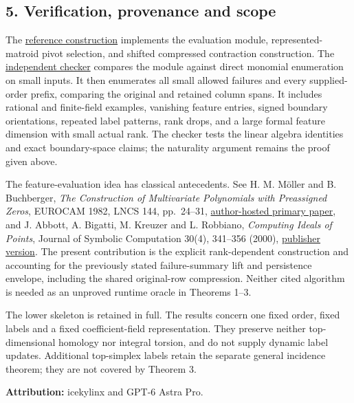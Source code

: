 \hypertarget{af-4b125c3959-verification-provenance-and-scope}{%
\subsection{5. Verification, provenance and scope}\label{af-4b125c3959-verification-provenance-and-scope}}

The \href{https://github.com/icekylinx/algorithm-frontier/blob/main/problems/persistence-failure-certificates/reference/feature_summary.py}{reference construction} implements the evaluation module, represented-matroid pivot selection, and shifted compressed contraction construction. The \href{https://github.com/icekylinx/algorithm-frontier/blob/main/problems/persistence-failure-certificates/verify/check_feature_construction.py}{independent checker} compares the module against direct monomial enumeration on small inputs. It then enumerates all small allowed failures and every supplied-order prefix, comparing the original and retained column spans. It includes rational and finite-field examples, vanishing feature entries, signed boundary orientations, repeated label patterns, rank drops, and a large formal feature dimension with small actual rank. The checker tests the linear algebra identities and exact boundary-space claims; the naturality argument remains the proof given above.

The feature-evaluation idea has classical antecedents. See H. M. Möller and B. Buchberger, \emph{The Construction of Multivariate Polynomials with Preassigned Zeros}, EUROCAM 1982, LNCS 144, pp.~24--31, \href{https://www.risc.jku.at/Groebner-Bases-Bibliography/gbbib_files/publication_378.pdf}{author-hosted primary paper}, and J. Abbott, A. Bigatti, M. Kreuzer and L. Robbiano, \emph{Computing Ideals of Points}, Journal of Symbolic Computation 30(4), 341--356 (2000), \href{https://doi.org/10.1006/jsco.2000.0411}{publisher version}. The present contribution is the explicit rank-dependent construction and accounting for the previously stated failure-summary lift and persistence envelope, including the shared original-row compression. Neither cited algorithm is needed as an unproved runtime oracle in Theorems 1--3.

The lower skeleton is retained in full. The results concern one fixed order, fixed labels and a fixed coefficient-field representation. They preserve neither top-dimensional homology nor integral torsion, and do not supply dynamic label updates. Additional top-simplex labels retain the separate general incidence theorem; they are not covered by Theorem 3.

\textbf{Attribution:} icekylinx and GPT-6 Astra Pro.
